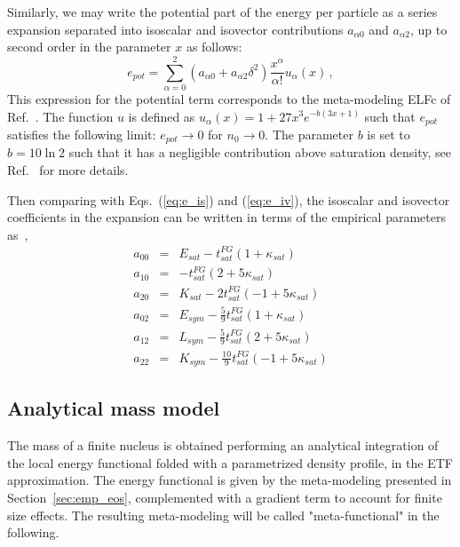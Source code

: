 \documentclass
[aps,prc,twocolumn,showpacs,showkeys,amsmath,floatfix,superscriptaddress]{revtex4}
\begin{document}
Similarly, we may write the potential part of the energy per particle as a series expansion separated into isoscalar and isovector contributions $a_{\alpha 0}$ and $a_{\alpha 2}$, up to second order in the parameter $x$ as follows:
\begin{equation}
e_{pot} = \sum_{\alpha=0}^2 (a_{\alpha 0} + a_{\alpha 2} \delta^2) \frac{x^{\alpha}}{\alpha!} u_{\alpha} (x) \,,
\label{eq:epot}
\end{equation}
{This expression for the potential term corresponds to the meta-modeling ELFc of Ref.~\cite{Casali1}.
The function $u$ is defined as $u_{\alpha} (x) = 1 +27x^3 e^{-b(3x+1)}$ such that $e_{pot}$ satisfies the following limit:
$e_{pot}\rightarrow 0$ for $n_0\rightarrow 0$.
The parameter $b$ is set to $b=10 \ln 2$ such that it has a negligible contribution above saturation density, see Ref.~\cite{Casali1} for more details.}

Then comparing with Eqs.~(\ref{eq:e_is}) and (\ref{eq:e_iv}), the isoscalar and isovector coefficients in the expansion can be written in terms of the 
empirical parameters as~\cite{Casali1},
\begin{eqnarray}
a_{00} &=& E_{sat} - t_{sat}^{FG} ( 1 + \kappa_{sat}) \\
a_{10} &=& - t_{sat}^{FG} ( 2 + 5 \kappa_{sat}) \\
a_{20} &=& K_{sat} - 2 t_{sat}^{FG} ( -1 + 5 \kappa_{sat} ) \\
a_{02} &=& E_{sym} - \frac{5}{9} t_{sat}^{FG} ( 1 + \kappa_{sat}) \\
a_{12} &=& L_{sym} - \frac{5}{9} t_{sat}^{FG} ( 2 + 5\kappa_{sat}) \\
a_{22} &=& K_{sym} - \frac{10}{9} t_{sat}^{FG} ( -1 + 5\kappa_{sat}) 
\end{eqnarray}



\subsection{Analytical mass model}\label{sec:mass_model}

The mass of a finite nucleus is obtained  performing an analytical integration of the local energy functional folded with a parametrized density profile, in the ETF approximation. 
The energy functional is given by the meta-modeling presented in Section~\ref{sec:emp_eos}, {complemented with a gradient term} to account for finite size effects. 
The resulting meta-modeling will be called 
 {"meta-functional"}
in the following.
\end{document}
